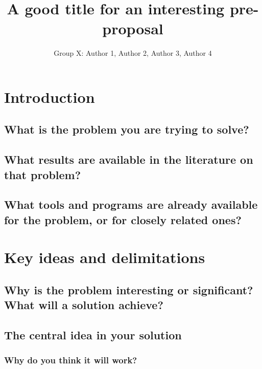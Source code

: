 \documentclass[a4paper,11pt]{report}
\begin{document}
\title{A good title for an interesting pre-proposal}
\author{Group X: Author 1, Author 2, Author 3, Author 4}
\maketitle
\begin{abstract}\centering
\end{abstract}

\chapter{Introduction}
\section{What is the problem you are trying to solve?}
\section{What results are available in the literature on that problem?}

\section{What tools and programs are already available for the problem, or for closely related ones?}

\chapter{Key ideas and delimitations} 
\section{Why is the problem interesting or significant?  What will a solution achieve?}
\section{The central idea in your solution}
\subsection{Why do you think it will work?}
\end{document}
